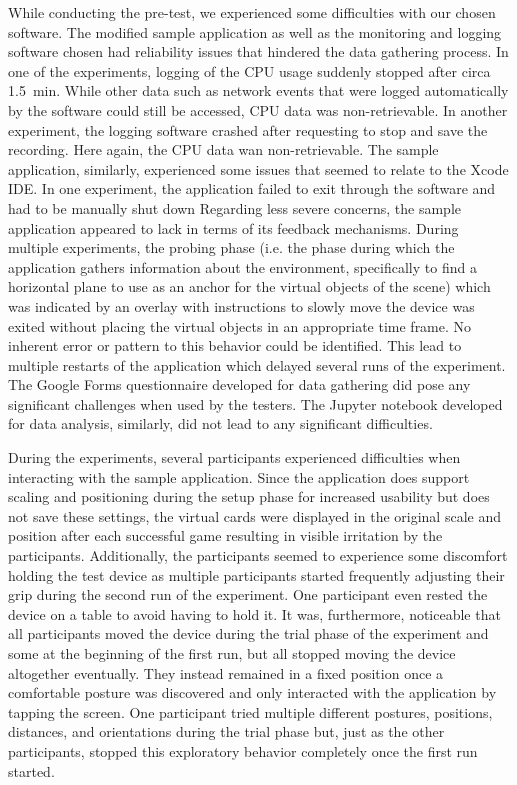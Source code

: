 \documentclass[12pt,twoside,english]{article}
\begin{document}
While conducting the pre-test, we experienced some difficulties with our chosen software.
The modified sample application as well as the monitoring and logging software chosen had reliability issues that hindered the data gathering process.
In one of the experiments, logging of the \gls{CPU} usage suddenly stopped after circa 1.5~min.
While other data such as network events that were logged automatically by the software could still be accessed, \gls{CPU} data was non-retrievable.
In another experiment, the logging software crashed after requesting to stop and save the recording.
Here again, the \gls{CPU} data wan non-retrievable.
The sample application, similarly, experienced some issues that seemed to relate to the Xcode \gls{IDE}.
In one experiment, the application failed to exit through the software and had to be manually shut down
Regarding less severe concerns, the sample application appeared to lack in terms of its feedback mechanisms.
During multiple experiments, the probing phase (i.e. the phase during which the application gathers information about the environment, specifically to find a horizontal plane to use as an anchor for the virtual objects of the scene) which was indicated by an overlay with instructions to slowly move the device was exited without placing the virtual objects in an appropriate time frame.
No inherent error or pattern to this behavior could be identified.
This lead to multiple restarts of the application which delayed several runs of the experiment.
The Google Forms questionnaire developed for data gathering did pose any significant challenges when used by the testers.
The Jupyter notebook developed for data analysis, similarly, did not lead to any significant difficulties.

During the experiments, several participants experienced difficulties when interacting with the sample application.
Since the application does support scaling and positioning during the setup phase for increased usability but does not save these settings, the virtual cards were displayed in the original scale and position after each successful game resulting in visible irritation by the participants.
Additionally, the participants seemed to experience some discomfort holding the test device as multiple participants started frequently adjusting their grip during the second run of the experiment.
One participant even rested the device on a table to avoid having to hold it.
It was, furthermore, noticeable that all participants moved the device during the trial phase of the experiment and some at the beginning of the first run, but all stopped moving the device altogether eventually.
They instead remained in a fixed position once a comfortable posture was discovered and only interacted with the application by tapping the screen.
One participant tried multiple different postures, positions, distances, and orientations during the trial phase but, just as the other participants, stopped this exploratory behavior completely once the first run started.
\end{document}
